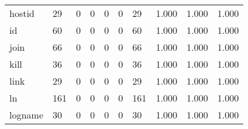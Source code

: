 \begin{longtable}{lp{1.3cm}p{1.3cm}p{1.3cm}p{1.3cm}p{1.3cm}p{1.3cm}p{1.3cm}p{1.3cm}p{1.3cm}}
hostid    &                     29 &                                             0 &                                            0 &                                           0 &                                            0 &                                         29 &                                1.000 &                                  1.000 &                                1.000 \\
id        &                     60 &                                             0 &                                            0 &                                           0 &                                            0 &                                         60 &                                1.000 &                                  1.000 &                                1.000 \\
join      &                     66 &                                             0 &                                            0 &                                           0 &                                            0 &                                         66 &                                1.000 &                                  1.000 &                                1.000 \\
kill      &                     36 &                                             0 &                                            0 &                                           0 &                                            0 &                                         36 &                                1.000 &                                  1.000 &                                1.000 \\
link      &                     29 &                                             0 &                                            0 &                                           0 &                                            0 &                                         29 &                                1.000 &                                  1.000 &                                1.000 \\
ln        &                    161 &                                             0 &                                            0 &                                           0 &                                            0 &                                        161 &                                1.000 &                                  1.000 &                                1.000 \\
logname   &                     30 &                                             0 &                                            0 &                                           0 &                                            0 &                                         30 &                                1.000 &                                  1.000 &                                1.000 \\

\end{longtable}
